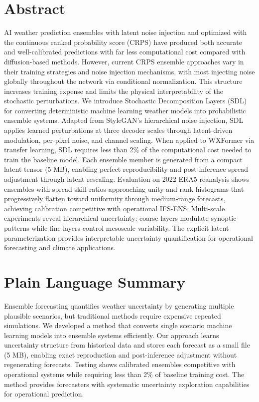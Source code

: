 \documentclass{agujournal2019}
\begin{document}
\section*{Abstract}
AI weather prediction ensembles with latent noise injection and optimized with the continuous ranked probability score (CRPS) have produced both accurate and well-calibrated predictions with far less computational cost compared with diffusion-based methods. However, current CRPS ensemble approaches vary in their training strategies and noise injection mechanisms, with most injecting noise globally throughout the network via conditional normalization. This structure increases training expense and limits the physical interpretability of the stochastic perturbations. We introduce Stochastic Decomposition Layers (SDL) for converting deterministic machine learning weather models into probabilistic ensemble systems. Adapted from StyleGAN's hierarchical noise injection, SDL applies learned perturbations at three decoder scales through latent-driven modulation, per-pixel noise, and channel scaling. When applied to WXFormer via transfer learning, SDL requires less than 2\% of the computational cost needed to train the baseline model. Each ensemble member is generated from a compact latent tensor (5 MB), enabling perfect reproducibility and post-inference spread adjustment through latent rescaling. Evaluation on 2022 ERA5 reanalysis shows ensembles with spread-skill ratios approaching unity and rank histograms that progressively flatten toward uniformity through medium-range forecasts, achieving calibration competitive with operational IFS-ENS. Multi-scale experiments reveal hierarchical uncertainty: coarse layers modulate synoptic patterns while fine layers control mesoscale variability. The explicit latent parameterization provides interpretable uncertainty quantification for operational forecasting and climate applications.

\section*{Plain Language Summary}
Ensemble forecasting quantifies weather uncertainty by generating multiple plausible scenarios, but traditional methods require expensive repeated simulations. We developed a method that converts single scenario machine learning models into ensemble systems efficiently. Our approach learns uncertainty structure from historical data and stores each forecast as a small file (5 MB), enabling exact reproduction and post-inference adjustment without regenerating forecasts. Testing shows calibrated ensembles competitive with operational systems while requiring less than 2\% of baseline training cost. The method provides forecasters with systematic uncertainty exploration capabilities for operational prediction.
\end{document}
